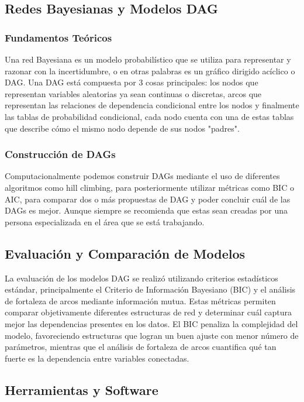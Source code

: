 \documentclass[12pt,a4paper]{article}
\begin{document}
\subsection{Redes Bayesianas y Modelos DAG}

\subsubsection{Fundamentos Teóricos}

Una red Bayesiana es un modelo probabilístico que se utiliza para representar y razonar con la incertidumbre, o en otras palabras es un gráfico dirigido acíclico o DAG. Una DAG está compuesta por 3 cosas principales: los nodos que representan variables aleatorias ya sean continuas o discretas, arcos que representan las relaciones de dependencia condicional entre los nodos y finalmente las tablas de probabilidad condicional, cada nodo cuenta con una de estas tablas que describe cómo el mismo nodo depende de sus nodos "padres".

\subsubsection{Construcción de DAGs}

Computacionalmente podemos construir DAGs mediante el uso de diferentes algoritmos como hill climbing, para posteriormente utilizar métricas como BIC o AIC, para comparar dos o más propuestas de DAG y poder concluir cuál de las DAGs es mejor. Aunque siempre se recomienda que estas sean creadas por una persona especializada en el área que se está trabajando.


\subsection{Evaluación y Comparación de Modelos}

La evaluación de los modelos DAG se realizó utilizando criterios estadísticos estándar, principalmente el Criterio de Información Bayesiano (BIC) y el análisis de fortaleza de arcos mediante información mutua. Estas métricas permiten comparar objetivamente diferentes estructuras de red y determinar cuál captura mejor las dependencias presentes en los datos. El BIC penaliza la complejidad del modelo, favoreciendo estructuras que logran un buen ajuste con menor número de parámetros, mientras que el análisis de fortaleza de arcos cuantifica qué tan fuerte es la dependencia entre variables conectadas.


\subsection{Herramientas y Software}
\end{document}

